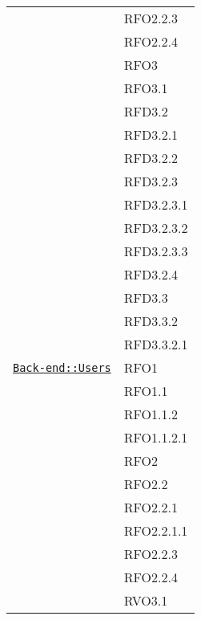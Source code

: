 \begin{longtable}{|>{\centering}m{10cm}|m{3cm}<{\centering}|}
& RFO2.2.3\\
& RFO2.2.4\\
& RFO3\\
& RFO3.1\\
& RFD3.2\\
& RFD3.2.1\\
& RFD3.2.2\\
& RFD3.2.3\\
& RFD3.2.3.1\\
& RFD3.2.3.2\\
& RFD3.2.3.3\\
& RFD3.2.4\\
& RFD3.3\\
& RFD3.3.2\\
& RFD3.3.2.1\\ \hline

\hyperref[Back-end::Users]{\texttt{Back-end::Users}} & RFO1\\
& RFO1.1\\
& RFO1.1.2\\
& RFO1.1.2.1\\
& RFO2\\
& RFO2.2\\
& RFO2.2.1\\
& RFO2.2.1.1\\
& RFO2.2.3\\
& RFO2.2.4\\
& RVO3.1\\ \hline


\end{longtable}
